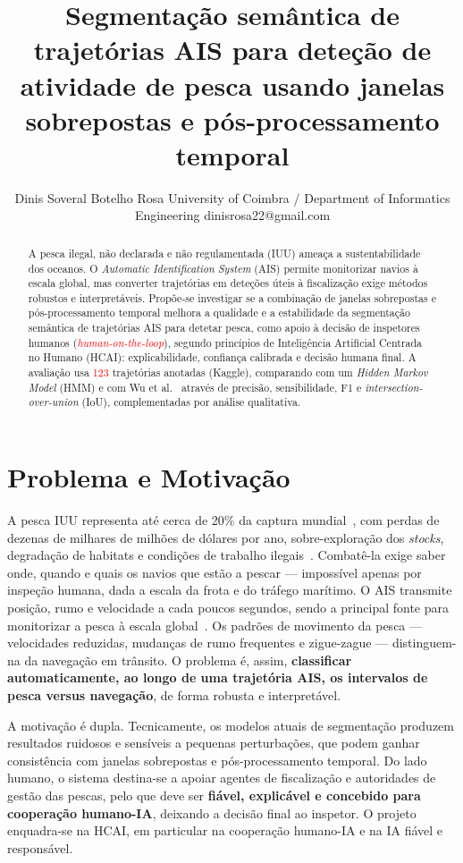 \documentclass{article}
\title{Segmenta\c{c}\~ao sem\^antica de trajet\'orias AIS para dete\c{c}\~ao de atividade de pesca usando janelas sobrepostas e p\'os-processamento temporal}
\author{
    Dinis Soveral Botelho Rosa
    \affiliations
    University of Coimbra / Department of Informatics Engineering
    \emails
    dinisrosa22@gmail.com
}
\begin{document}
\maketitle

\begin{abstract}
A pesca ilegal, não declarada e não regulamentada (IUU) ameaça a sustentabilidade dos oceanos. O \emph{Automatic Identification System} (AIS) permite monitorizar navios à escala global, mas converter trajetórias em deteções úteis à fiscalização exige métodos robustos e interpretáveis. Propõe-se investigar se a combinação de janelas sobrepostas e pós-processamento temporal melhora a qualidade e a estabilidade da segmentação semântica de trajetórias AIS para detetar pesca, como apoio à decisão de inspetores humanos (\textcolor{red}{\emph{human-on-the-loop}}), segundo princípios de Inteligência Artificial Centrada no Humano (HCAI): explicabilidade, confiança calibrada e decisão humana final. A avaliação usa \textcolor{red}{123} trajetórias anotadas (Kaggle), comparando com um \emph{Hidden Markov Model} (HMM) e com Wu et al.~ através de precisão, sensibilidade, F1 e \emph{intersection-over-union} (IoU), complementadas por análise qualitativa.
\end{abstract}

\section{Problema e Motivação}
\label{sec:problema-motivacao}

A pesca IUU representa até cerca de 20\% da captura mundial~\cite{agnew2009}, com perdas de dezenas de milhares de milhões de dólares por ano, sobre-exploração dos \emph{stocks}, degradação de habitats e condições de trabalho ilegais~\cite{chuaysi2020}. Combatê-la exige saber onde, quando e quais os navios que estão a pescar --- impossível apenas por inspeção humana, dada a escala da frota e do tráfego marítimo. O AIS transmite posição, rumo e velocidade a cada poucos segundos, sendo a principal fonte para monitorizar a pesca à escala global~\cite{natale2015,kroodsma2018}. Os padrões de movimento da pesca --- velocidades reduzidas, mudanças de rumo frequentes e zigue-zague --- distinguem-na da navegação em trânsito. O problema é, assim, \textbf{classificar automaticamente, ao longo de uma trajetória AIS, os intervalos de pesca versus navegação}, de forma robusta e interpretável.

A motivação é dupla. Tecnicamente, os modelos atuais de segmentação produzem resultados ruidosos e sensíveis a pequenas perturbações, que podem ganhar consistência com janelas sobrepostas e pós-processamento temporal. Do lado humano, o sistema destina-se a apoiar agentes de fiscalização e autoridades de gestão das pescas, pelo que deve ser \textbf{fiável, explicável e concebido para cooperação humano-IA}, deixando a decisão final ao inspetor. O projeto enquadra-se na HCAI, em particular na cooperação humano-IA e na IA fiável e responsável.
\end{document}
